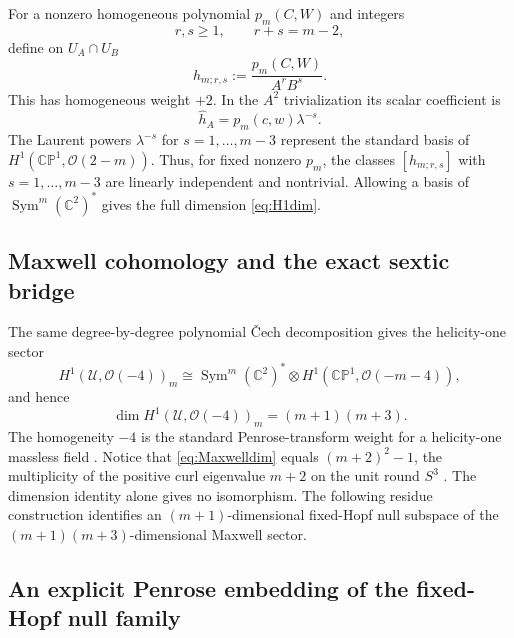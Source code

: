 \documentclass[aps,prd,reprint,nofootinbib,superscriptaddress]{revtex4-2}
\theoremstyle{definition}
\theoremstyle{remark}
\newcommand{\C}{\mathbb{C}}
\newcommand{\CP}{\mathbb{CP}}
\newcommand{\cO}{\mathcal{O}}
\newcommand{\cU}{\mathcal{U}}
\newcommand{\Sym}{\operatorname{Sym}}
\begin{document}
For a nonzero homogeneous polynomial $p_m(C,W)$ and integers
\begin{equation}
r,s\ge1,
\qquad r+s=m-2,
\label{eq:rs}
\end{equation}
define on $U_A\cap U_B$
\begin{equation}
h_{m;r,s}:=\frac{p_m(C,W)}{A^rB^s}.
\label{eq:hCech}
\end{equation}
This has homogeneous weight $+2$. In the $A^2$ trivialization its scalar coefficient is
\begin{equation}
\widehat h_A=p_m(c,w)\lambda^{-s}.
\label{eq:hhat}
\end{equation}
The Laurent powers $\lambda^{-s}$ for $s=1,\ldots,m-3$ represent the standard basis of $H^1(\CP^1,\cO(2-m))$. Thus, for fixed nonzero $p_m$, the classes $[h_{m;r,s}]$ with $s=1,\ldots,m-3$ are linearly independent and nontrivial. Allowing a basis of $\Sym^m(\C^2)^*$ gives the full dimension \eqref{eq:H1dim}.

\subsection{Maxwell cohomology and the exact sextic bridge}
\label{subsec:sexticbridge}

The same degree-by-degree polynomial \v{C}ech decomposition gives the helicity-one sector
\begin{equation}
H^1(\cU,\cO(-4))_m
\cong
\Sym^m(\C^2)^*\otimes H^1(\CP^1,\cO(-m-4)),
\label{eq:Maxwellgraded}
\end{equation}
and hence
\begin{equation}
\dim H^1(\cU,\cO(-4))_m=(m+1)(m+3).
\label{eq:Maxwelldim}
\end{equation}
The homogeneity $-4$ is the standard Penrose-transform weight for a helicity-one massless field \cite{WardWells1990}.  Notice that \eqref{eq:Maxwelldim} equals $(m+2)^2-1$, the multiplicity of the positive curl eigenvalue $m+2$ on the unit round $S^3$ \cite{Baer2019}.  The dimension identity alone gives no isomorphism. The following residue construction identifies an $(m+1)$-dimensional fixed-Hopf null subspace of the $(m+1)(m+3)$-dimensional Maxwell sector.

\subsection{An explicit Penrose embedding of the fixed-Hopf null family}
\label{subsec:explicitPenrose}
\end{document}
